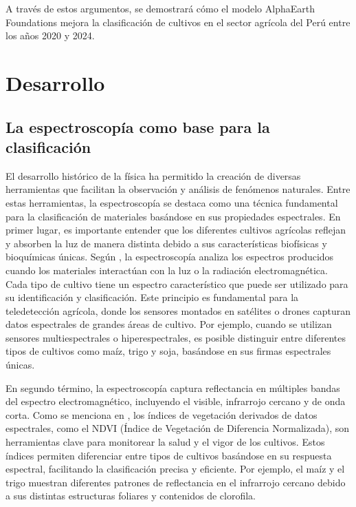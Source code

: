 A través de estos argumentos, se demostrará cómo el modelo AlphaEarth Foundations mejora la clasificación de cultivos en el sector agrícola del Perú entre los años 2020 y 2024.

\newpage

\section{Desarrollo}

\subsection{La espectroscopía como base para la clasificación}
El desarrollo histórico de la física ha permitido la creación de diversas herramientas que facilitan la observación y análisis de fenómenos naturales. Entre estas herramientas, la espectroscopía se destaca como una técnica fundamental para la clasificación de materiales basándose en sus propiedades espectrales. En primer lugar, es importante entender que los diferentes cultivos agrícolas reflejan y absorben la luz de manera distinta debido a sus características biofísicas y bioquímicas únicas. Según \cite{Vullaganti2025}, la espectroscopía analiza los espectros producidos cuando los materiales interactúan con la luz o la radiación electromagnética. Cada tipo de cultivo tiene un espectro característico que puede ser utilizado para su identificación y clasificación. Este principio es fundamental para la teledetección agrícola, donde los sensores montados en satélites o drones capturan datos espectrales de grandes áreas de cultivo. Por ejemplo, cuando se utilizan sensores multiespectrales o hiperespectrales, es posible distinguir entre diferentes tipos de cultivos como maíz, trigo y soja, basándose en sus firmas espectrales únicas.

En segundo término, la espectroscopía captura reflectancia en múltiples bandas del espectro electromagnético, incluyendo el visible, infrarrojo cercano y de onda corta. Como se menciona en \cite{Brown2025}, los índices de vegetación derivados de datos espectrales, como el NDVI (Índice de Vegetación de Diferencia Normalizada), son herramientas clave para monitorear la salud y el vigor de los cultivos. Estos índices permiten diferenciar entre tipos de cultivos basándose en su respuesta espectral, facilitando la clasificación precisa y eficiente. Por ejemplo, el maíz y el trigo muestran diferentes patrones de reflectancia en el infrarrojo cercano debido a sus distintas estructuras foliares y contenidos de clorofila.

